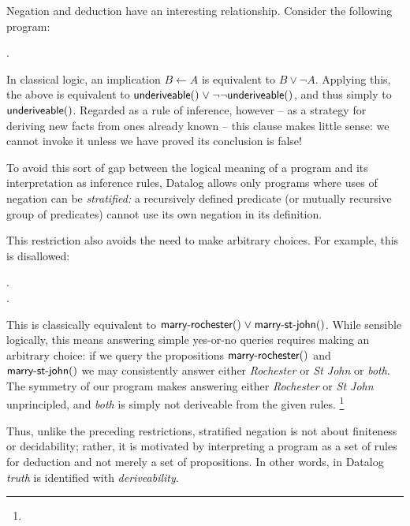 Negation and deduction have an interesting relationship.
%
Consider the following program:

\nopagebreak[1]
\begin{datalog}
   \gets \neg {}.
\end{datalog}

\noindent
In classical logic, an implication $B \gets A$ is equivalent to $B \vee \neg A$.
Applying this, the above is equivalent to $\atom{underiveable}{} \vee
\neg\neg\atom{underiveable}{}$, and thus simply to $\text{\sffamily underiveable}({})$.
%
Regarded as a rule of inference, however -- as a strategy for deriving new facts
from ones already known -- this clause makes little sense: we cannot invoke it
unless we have proved its conclusion is false!

To avoid this sort of gap between the logical meaning of a program and its
interpretation as inference rules, Datalog allows only programs where uses of
negation can be \emph{stratified:} a recursively defined predicate (or mutually
recursive group of predicates) cannot use its own negation in its definition.

This restriction also avoids the need to make arbitrary choices. For example,
this is disallowed:

\nopagebreak[1]
\begin{datalog}
   \gets \neg {}.\\
   \gets \neg {}.
\end{datalog}

This is classically equivalent to $\atom{marry-rochester}{} \vee
\atom{marry-st-john}{}$. While sensible logically, this means answering simple
yes-or-no queries requires making an arbitrary choice: if we query the
propositions $\text{\sffamily marry-rochester}({})$ and $\text{\sffamily marry-st-john}({})$ we
may consistently answer either \emph{Rochester} or \emph{St John} or
\emph{both}.
%
The symmetry of our program makes answering either
\emph{Rochester} or \emph{St John} unprincipled, and \emph{both} is simply
not deriveable from the given rules.%
%
\footnote{}

Thus, unlike the preceding restrictions, stratified negation is not about
finiteness or decidability; rather, it is motivated by interpreting a program
as a set of rules for deduction and not merely a set of propositions. In other
words, in Datalog \emph{truth} is identified with \emph{deriveability}.

